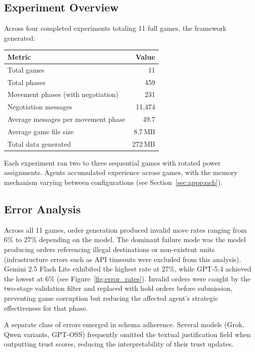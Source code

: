 \documentclass[a4paper,oneside,bibliography=totoc]{scrartcl}
\begin{document}
\subsection{Experiment Overview}

Across four completed experiments totaling 11 full games, the framework generated:

\begin{center}
\begin{tabular}{lr}
  \toprule
  Metric & Value \\
  \midrule
  Total games & 11 \\
  Total phases & 459 \\
  Movement phases (with negotiation) & 231 \\
  Negotiation messages & 11{,}474 \\
  Average messages per movement phase & 49.7 \\
  Average game file size & 8.7\,MB \\
  Total data generated & 272\,MB \\
  \bottomrule
\end{tabular}
\end{center}

\noindent Each experiment ran two to three sequential games with rotated power assignments. Agents accumulated experience across games, with the memory mechanism varying between configurations (see Section~\ref{sec:approach}).

\subsection{Error Analysis}

Across all 11 games, order generation produced invalid move rates ranging from 6\% to 27\% depending on the model. The dominant failure mode was the model producing orders referencing illegal destinations or non-existent units (infrastructure errors such as API timeouts were excluded from this analysis). Gemini 2.5 Flash Lite exhibited the highest rate at 27\%, while GPT-5.4 achieved the lowest at 6\% (see Figure~\ref{fig:error_rates}). Invalid orders were caught by the two-stage validation filter and replaced with hold orders before submission, preventing game corruption but reducing the affected agent's strategic effectiveness for that phase.

A separate class of errors emerged in schema adherence. Several models (Grok, Qwen variants, GPT-OSS) frequently omitted the textual justification field when outputting trust scores, reducing the interpretability of their trust updates.
\end{document}
